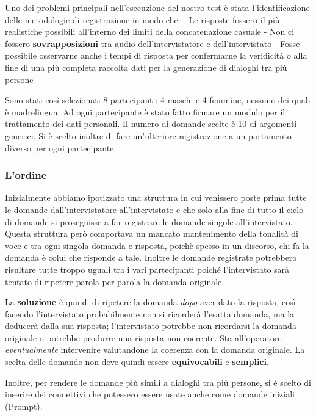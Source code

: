 \documentclass[
]{article}
\begin{document}
Uno dei problemi principali nell'esecuzione del nostro test è stata l'identificazione delle metodologie di registrazione in modo che: - Le risposte fossero il più realistiche possibili all'interno dei limiti della concatenazione casuale - Non ci fossero \textbf{sovrapposizioni} tra audio dell'intervistatore e dell'intervistato - Fosse possibile osservarne anche i tempi di risposta per confermarne la veridicità o alla fine di una più completa raccolta dati per la generazione di dialoghi tra più persone

Sono stati così selezionati 8 partecipanti: 4 maschi e 4 femmine, nessuno dei quali è madrelingua. Ad ogni partecipante è stato fatto firmare un modulo per il trattamento dei dati personali. Il numero di domande scelte è 10 di argomenti generici. Si è scelto inoltre di fare un'ulteriore registrazione a un portamento diverso per ogni partecipante.

\subsubsection{L'ordine}\label{lordine}

Inizialmente abbiamo ipotizzato una struttura in cui venissero poste prima tutte le domande dall'intervistatore all'intervistato e che solo alla fine di tutto il ciclo di domande si proseguisse a far registrare le domande singole all'intervistato. Questa struttura però comportava un mancato mantenimento della tonalità di voce e tra ogni singola domanda e risposta, poichè spesso in un discorso, chi fa la domanda è colui che risponde a tale. Inoltre le domande registrate potrebbero risultare tutte troppo uguali tra i vari partecipanti poiché l'intervistato sarà tentato di ripetere parola per parola la domanda originale.

La \textbf{soluzione} è quindi di ripetere la domanda \emph{dopo} aver dato la risposta, così facendo l'intervistato probabilmente non si ricorderà l'esatta domanda, ma la deducerà dalla sua risposta; l'intervistato potrebbe non ricordarsi la domanda originale o potrebbe produrre una risposta non coerente. Sta all'operatore \emph{eventualmente} intervenire valutandone la coerenza con la domanda originale. La scelta delle domande non deve quindi essere \textbf{equivocabili} e \textbf{semplici}.

Inoltre, per rendere le domande più simili a dialoghi tra più persone, si è scelto di inserire dei connettivi che potessero essere usate anche come domande iniziali (Prompt).
\end{document}
